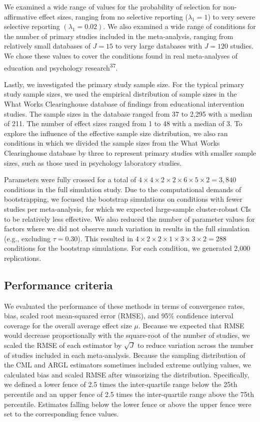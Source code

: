 \documentclass[
  american,
  man, donotrepeattitle,floatsintext]{apa7}
\begin{document}
We examined a wide range of values for the probability of selection for non-affirmative effect sizes, ranging from no selective reporting (\(\lambda_1 = 1\)) to very severe selective reporting \((\lambda_1 = 0.02)\).
We also examined a wide range of conditions for the number of primary studies included in the meta-analysis, ranging from relatively small databases of \(J = 15\) to very large databases with \(J = 120\) studies.
We chose these values to cover the conditions found in real meta-analyses of education and psychology research\textsuperscript{37}.

Lastly, we investigated the primary study sample size.
For the typical primary study sample sizes, we used the empirical distribution of sample sizes in the What Works Clearinghouse database of findings from educational intervention studies.
The sample sizes in the database ranged from 37 to 2,295 with a median of 211.
The number of effect sizes ranged from 1 to 48 with a median of 3.
To explore the influence of the effective sample size distribution, we also ran conditions in which we divided the sample
sizes from the What Works Clearinghouse database by three to represent primary studies with smaller sample sizes,
such as those used in psychology laboratory studies.

Parameters were fully crossed for a total of \(4 \times 4 \times 2 \times 2 \times 6 \times 5 \times 2 = 3,840\) conditions in the full simulation study.
Due to the computational demands of bootstrapping, we focused the bootstrap simulations on conditions with fewer studies per meta-analysis, for which we expected large-sample cluster-robust CIs to be relatively less effective.
We also reduced the number of parameter values for factors where we did
not observe much variation in results in the full simulation
(e.g., excluding \(\tau = 0.30\)).
This resulted in \(4 \times 2 \times 2 \times 1 \times 3 \times 3 \times 2 = 288\) conditions for the bootstrap simulations.
For each condition, we generated 2,000 replications.

\subsection{Performance criteria}\label{performance-criteria}

We evaluated the performance of these methods in terms of convergence rates, bias,
scaled root mean-squared error (RMSE), and 95\% confidence interval coverage for the overall average effect size \(\mu\).
Because we expected that RMSE would decrease proportionally with the square-root of the number of studies, we scaled the RMSE of each estimator by \(\sqrt{J}\) to reduce variation across the number of studies included in each meta-analysis.
Because the sampling distribution of the CML and ARGL estimators sometimes included extreme outlying values, we calculated bias and scaled RMSE after winsorizing the distribution.
Specifically, we defined a lower fence of 2.5 times the inter-quartile range below the 25th percentile and an upper fence of 2.5 times the inter-quartile range above the 75th percentile.
Estimates falling below the lower fence or above the upper fence were set to the corresponding fence values.
\end{document}
